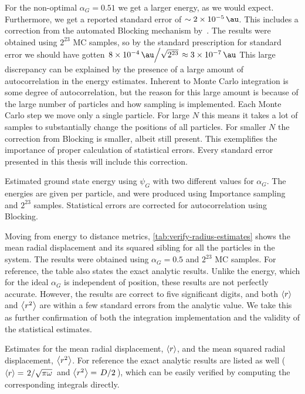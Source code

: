 \documentclass[Thesis.tex]{subfiles}
\begin{document}
For the non-optimal $\alpha_G=0.51$ we get a larger energy, as we would expect.
Furthermore, we get a reported standard error of $\sim \SI{2e-5}{\au}$. This
includes a correction from the automated Blocking mechanism
by~\textcite{Jonsson-2018}. The results were obtained using $2^{23}$ MC
samples, so by the standard prescription for standard error we should have
gotten $\flatfrac{\SI{8e-4}{\au}}{\sqrt{2^{23}}} \approx \SI{3e-7}{\au}$ This
large discrepancy can be explained by the presence of a large amount of
autocorrelation in the energy estimates. Inherent to Monte Carlo integration is
some degree of autocorrelation, but the reason for this large amount is because
of the large number of particles and how sampling is implemented. Each Monte
Carlo step we move only a single particle. For large $N$ this means it takes a
lot of samples to substantially change the positions of all particles. For smaller
$N$ the correction from Blocking is smaller, albeit still present. This
exemplifies the importance of proper calculation of statistical errors. Every
standard error presented in this thesis will include this correction.


\begin{table}[h]
  \centering
  \caption[Ground state energies of the ideal harmonic oscillator]{\label{tab:verify-energy-estimates}Estimated ground state energy
    using $\psi_G$ with two different values for $\alpha_G$. The energies are
    given per particle, and were produced using Importance sampling and
    $2^{23}$ samples. Statistical errors are corrected for autocorrelation using
    Blocking.}
  
\end{table}

Moving from energy to distance metrics, \cref{tab:verify-radius-estimates} shows
the mean radial displacement and its squared sibling for all the particles in the system.
The results were obtained using $\alpha_G=0.5$ and $2^{23}$ MC samples. For
reference, the table also states the exact analytic results. Unlike the energy,
which for the ideal $\alpha_G$ is independent of position, these results are not
perfectly accurate. However, the results are correct to five significant digits,
and both $\expval{r}$ and $\expval{r^2}$ are within a few standard errors from
the analytic value. We take this as further confirmation of both the integration
implementation and the validity of the statistical estimates.

\begin{table}[h]
  \centering
  \caption[Radial metrics of the ideal harmonic oscillator]{\label{tab:verify-radius-estimates}Estimates for the mean radial
    displacement, $\expval{r}$, and the mean squared radial displacement,
    $\expval{r^2}$. For reference the exact analytic results are listed as well
    ($\expval{r}=\flatfrac{2}{\sqrt{\pi\omega}}$ and
    $\expval{r^2}=\flatfrac{D}{2}$), which can be easily verified by computing
    the corresponding integrals directly.}
  
\end{table}
\end{document}
